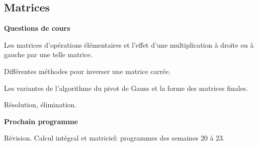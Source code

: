 





\subsection{Matrices}





\bigskip
\begin{center}
 \textbf{Questions de cours}
\end{center}
Les matrices d'opérations élémentaires et l'effet d'une multiplication à droite ou à gauche par une telle matrice.\newline

Différentes méthodes pour inverser une matrice carrée.\newline

Les variantes de l'algorithme du pivot de Gauss et la forme des matrices finales.\newline

Résolution, élimination.

\begin{center}
 \textbf{Prochain programme}
\end{center}
Révision. Calcul intégral et matriciel: programmes des semaines 20 à 23.

